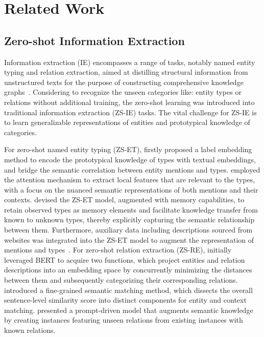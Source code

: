 \section{Related Work}
\subsection{Zero-shot Information Extraction}
%
Information extraction (IE) encompasses a range of tasks, notably named entity
typing and relation extraction, aimed at distilling structural information from
unstructured texts for the purpose of constructing comprehensive knowledge
graphs~\cite{DBLP:journals/corr/abs-2302-05019}.
%
Considering to recognize the unseen categories like: entity types or relations
without additional training, the zero-shot learning was introduced into
traditional information extraction (ZS-IE) tasks.
%
The vital challenge for ZS-IE is to learn generalizable representations of
entities and prototypical knowledge of categories.

For zero-shot named entity typing (ZS-ET), \citet{DBLP:conf/coling/MaCG16}
firstly proposed a label embedding method to encode the prototypical knowledge
of types with textual embeddings, and bridge the semantic correlation between
entity mentions and types.
%
\citet{DBLP:conf/www/RenLZ20} employed the attention mechanism to extract local
features that are relevant to the types, with a focus on the nuanced semantic
representations of both mentions and their contexts.
%
\citet{DBLP:conf/coling/ZhangXLY20} devised the ZS-ET model, augmented with
memory capabilities, to retain observed types as memory elements and facilitate
knowledge transfer from known to unknown types, thereby explicitly capturing the
semantic relationship between them.
%
Furthermore, auxiliary data including descriptions sourced from websites was
integrated into the ZS-ET model to augment the representation of mentions and
types~\cite{DBLP:conf/naacl/ObeidatFST19,DBLP:conf/emnlp/0019JL0FYX21}.
%
For zero-shot relation extraction (ZS-RE), \citet{chen-li-2021-zs} initially
leveraged BERT to acquire two functions, which project entities and relation
descriptions into an embedding space by concurrently minimizing the distances
between them and subsequently categorizing their corresponding relations.
%
\citet{DBLP:conf/acl/ZhaoZZZGWWPS23} introduced a fine-grained semantic matching
method, which dissects the overall sentence-level similarity score into distinct
components for entity and context matching.
%
\citet{DBLP:conf/coling/GongE24a} presented a prompt-driven model that augments
semantic knowledge by creating instances featuring unseen relations from
existing instances with known relations.

